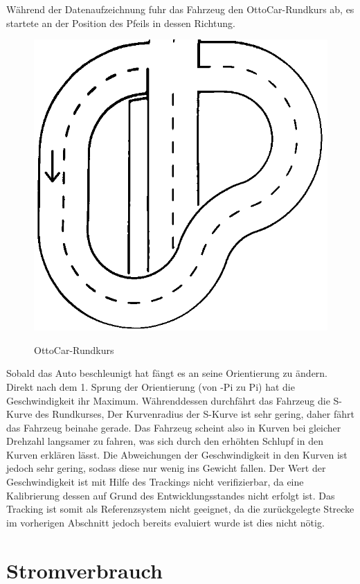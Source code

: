 Während der Datenaufzeichnung fuhr das Fahrzeug den OttoCar-Rund\-kurs ab, es startete  an der Position des Pfeils in dessen Richtung.


\begin{figure}[H]
\centering
\includegraphics[width=.8\textwidth]{Strasse_mono.png}\\
\caption{OttoCar-Rundkurs}%
\label{fig:strasse}
\end{figure}

Sobald das Auto beschleunigt hat fängt es an seine Orientierung zu ändern. Direkt nach dem 1. Sprung der Orientierung (von -Pi zu Pi)
hat die Geschwindigkeit ihr Maximum. Währenddessen durchfährt das Fahrzeug die S-Kurve des Rundkurses, Der Kurvenradius der S-Kurve ist sehr gering, daher fährt das Fahrzeug
beinahe gerade. Das Fahrzeug scheint also in Kurven bei gleicher Drehzahl langsamer zu fahren, was sich durch  den erhöhten Schlupf in den Kurven erklären lässt. Die Abweichungen 
der Geschwindigkeit in den Kurven ist jedoch sehr gering, sodass diese nur wenig ins Gewicht fallen. Der Wert der Geschwindigkeit ist mit Hilfe des Trackings nicht verifizierbar,
da eine Kalibrierung dessen auf Grund des Entwicklungsstandes nicht erfolgt ist. Das Tracking ist somit als Referenzsystem nicht geeignet, da die zurückgelegte Strecke im vorherigen
Abschnitt jedoch bereits evaluiert wurde ist dies nicht nötig.


\section{Stromverbrauch}

